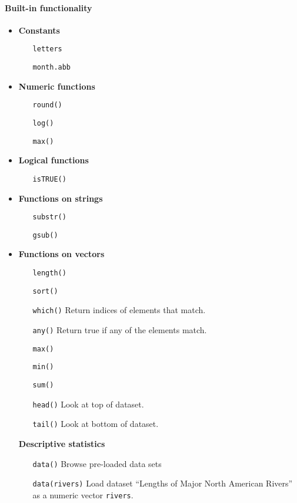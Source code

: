 \paragraph{Built-in functionality}
\begin{itemize}
\item \textbf{Constants}
\begin{enumerate}
\item[\texttt{letters}]
\item[\texttt{month.abb}]
\end{enumerate}
\item \textbf{Numeric functions}
\begin{enumerate}
\item[\texttt{round()}]
\item[\texttt{log()}]
\item[\texttt{max()}]
\end{enumerate}
\item \textbf{Logical functions}
\begin{enumerate}
\item[\texttt{isTRUE()}]
\end{enumerate}
\item \textbf{Functions on strings}
\begin{enumerate}
\item[\texttt{substr()}]
\item[\texttt{gsub()}]
\end{enumerate}
\item \textbf{Functions on vectors}
\begin{enumerate}
\item[\texttt{length()}]
\item[\texttt{sort()}]
\item[\texttt{which()}] Return indices of elements that match.
\item[\texttt{any()}] Return true if any of the elements match.
\item[\texttt{max()}]
\item[\texttt{min()}]
\item[\texttt{sum()}]
\item[\texttt{head()}] Look at top of dataset.
\item[\texttt{tail()}] Look at bottom of dataset.
\end{enumerate}
\textbf{Descriptive statistics}
\begin{enumerate}
\item[\texttt{data()}] Browse pre-loaded data sets
\item[\texttt{data(rivers)}] Load dataset ``Lengths of Major North American Rivers'' as a numeric vector \texttt{rivers}.

\end{enumerate}
\end{itemize}
